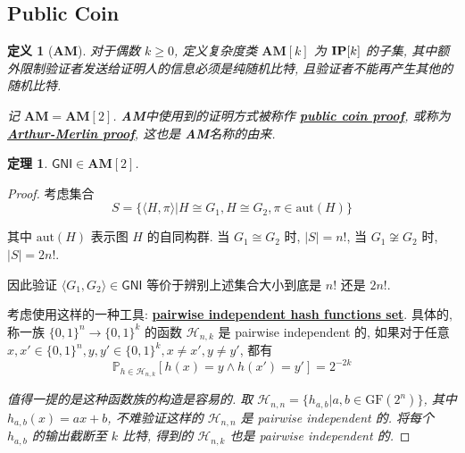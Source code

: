 \documentclass[8pt]{article}
\theoremstyle{compact}
\newtheorem{theorem}{定理}[section]
\newtheorem{definition}{定义}[section]
\def\obj#1{\textbf{\uline{#1}}}
\def\ge{\geqslant}
\begin{document}
\subsection{Public Coin}
\def\AM{\textbf{AM}}
\begin{definition}[\AM]
	对于偶数 $k \ge 0$, 定义复杂度类 $\AM[k]$ 为 $\textbf{IP}[k]$ 的子集, 其中额外限制验证者发送给证明人的信息必须是纯随机比特, 且验证者不能再产生其他的随机比特.

	记 $\AM = \AM[2]$. \AM 中使用到的证明方式被称作 \obj{public coin proof}, 或称为 \obj{Arthur-Merlin proof}, 这也是 \AM 名称的由来.
\end{definition}
\begin{theorem}
	$\textsf{GNI} \in \AM[2]$.
\end{theorem}
\begin{proof}
	考虑集合 $$S = \{\langle H, \pi \rangle | H \cong G_1, H \cong G_2, \pi \in \text{aut}(H)\}$$

	其中 $\text{aut}(H)$ 表示图 $H$ 的自同构群. 当 $G_1 \cong G_2$ 时, $|S| = n!$, 当 $G_1 \not\cong G_2$ 时, $|S| = 2n!$.

	因此验证 $\langle G_1, G_2 \rangle \in \textsf{GNI}$ 等价于辨别上述集合大小到底是 $n!$ 还是 $2n!$.

	考虑使用这样的一种工具: \obj{pairwise independent hash functions set}. 具体的, 称一族 $\{0, 1\}^n \to \{0, 1\}^k$ 的函数 $\mathcal H_{n, k}$ 是 pairwise independent 的, 如果对于任意 $x, x' \in \{0, 1\}^n, y, y' \in \{0, 1\}^k, x \neq x', y \neq y'$, 都有 $$\mathbb P_{h \in \mathcal H_{n, k}} [h(x) = y \wedge h(x') = y'] = 2^{-2k}$$

	\textit{值得一提的是这种函数族的构造是容易的. 取 $\mathcal H_{n, n} = \{h_{a, b} | a, b \in \text{GF}(2^n)\}$, 其中 $h_{a, b}(x) = ax + b$, 不难验证这样的 $\mathcal H_{n, n}$ 是 pairwise independent 的. 将每个 $h_{a, b}$ 的输出截断至 $k$ 比特, 得到的 $\mathcal H_{n, k}$ 也是 pairwise independent 的.}


\end{proof}
\end{document}

